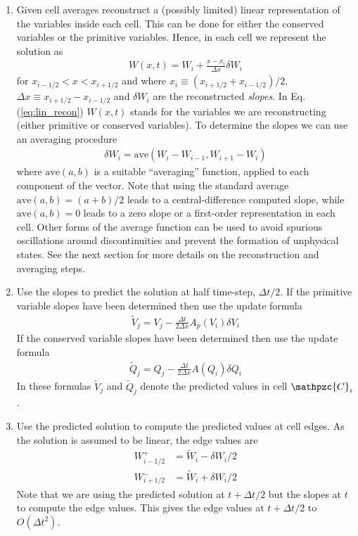 \documentclass[12pt]{article}
\theoremstyle{definition}
\theoremstyle{definition}
\theoremstyle{definition}
\newcommand{\eqr}[1]{Eq.\thinspace(#1)}
\newcommand{\script}[1]{\mathpzc{#1}}
\begin{document}
\begin{enumerate}

\item Given cell averages reconstruct a (possibly limited) linear
  representation of the variables inside each cell. This can be done
  for either the conserved variables or the primitive
  variables. Hence, in each cell we represent the solution as
  \begin{align}
    W(x,t) = W_i + \frac{x-x_i}{\Delta x}\delta W_i \label{eq:lin_recon}
  \end{align}
  for $x_{i-1/2}<x<x_{i+1/2}$ and where $x_i \equiv
  (x_{i+1/2}+x_{i-1/2})/2$, $\Delta x \equiv x_{i+1/2}-x_{i-1/2}$ and
  $\delta W_i$ are the reconstructed \emph{slopes}. In
  \eqr{\ref{eq:lin_recon}} $W(x,t)$ stands for the variables we are
  reconstructing (either primitive or conserved variables). To
  determine the slopes we can use an averaging procedure
  \begin{align}
    \delta W_i = \mathrm{ave}(W_i-W_{i-1}, W_{i+1}-W_i) \label{eqn:slope_recon}
  \end{align}
  where $\mathrm{ave}(a, b)$ is a suitable ``averaging'' function,
  applied to each component of the vector. Note that using the
  standard average $\mathrm{ave}(a, b) = (a+b)/2$ leads to a
  central-difference computed slope, while $\mathrm{ave}(a, b) = 0$
  leads to a zero slope or a first-order representation in each
  cell. Other forms of the average function can be used to avoid
  spurious oscillations around discontinuities and prevent the
  formation of unphysical states. See the next section for more
  details on the reconstruction and averaging steps.
  
\item Use the slopes to predict the solution at half time-step,
  $\Delta t/2$. If the primitive variable slopes have been determined
  then use the update formula
  \begin{align}
    \tilde{V}_j = V_j -\frac{\Delta t}{2 \Delta x} A_p(V_i) \delta V_i
  \end{align}
  If the conserved variable slopes have been determined then use the
  update formula
  \begin{align}
    \tilde{Q}_j = Q_j -\frac{\Delta t}{2 \Delta x} A(Q_i) \delta Q_i
  \end{align}
  In these formulas $\tilde{V}_j$ and $\tilde{Q}_j$ denote the
  predicted values in cell $\script{C}_i$.

\item Use the predicted solution to compute the predicted values at
  cell edges. As the solution is assumed to be linear, the edge values
  are
  \begin{align}
    W_{i-1/2}^+ &= \tilde{W}_i - \delta W_i/2 \\
    W_{i+1/2}^- &= \tilde{W}_i + \delta W_i/2
  \end{align}
  Note that we are using the predicted solution at $t+\Delta t/2$ but
  the slopes at $t$ to compute the edge values. This gives the edge
  values at $t+\Delta t/2$ to $O(\Delta t^2)$.


\end{enumerate}
\end{document}
